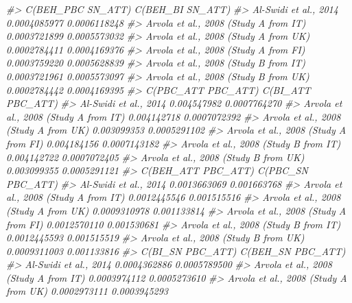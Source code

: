 \documentclass[
]{book}
\newenvironment{Shaded}{\begin{snugshade}}{\end{snugshade}}
\newcommand{\CommentTok}[1]{\textcolor[rgb]{0.56,0.35,0.01}{\textit{#1}}}
\begin{document}
\begin{Shaded}
\begin{Highlighting}[]
\CommentTok{\#\textgreater{}                                       C(BEH\_PBC SN\_ATT) C(BEH\_BI SN\_ATT)}
\CommentTok{\#\textgreater{} Al{-}Swidi et al., 2014                      0.0004085977     0.0006118248}
\CommentTok{\#\textgreater{} Arvola et al., 2008 (Study A from IT)      0.0003721899     0.0005573032}
\CommentTok{\#\textgreater{} Arvola et al., 2008 (Study A from UK)      0.0002784411     0.0004169376}
\CommentTok{\#\textgreater{} Arvola et al., 2008 (Study A from FI)      0.0003759220     0.0005628839}
\CommentTok{\#\textgreater{} Arvola et al., 2008 (Study B from IT)      0.0003721961     0.0005573097}
\CommentTok{\#\textgreater{} Arvola et al., 2008 (Study B from UK)      0.0002784442     0.0004169395}
\CommentTok{\#\textgreater{}                                       C(PBC\_ATT PBC\_ATT) C(BI\_ATT PBC\_ATT)}
\CommentTok{\#\textgreater{} Al{-}Swidi et al., 2014                        0.004547982      0.0007764270}
\CommentTok{\#\textgreater{} Arvola et al., 2008 (Study A from IT)        0.004142718      0.0007072392}
\CommentTok{\#\textgreater{} Arvola et al., 2008 (Study A from UK)        0.003099353      0.0005291102}
\CommentTok{\#\textgreater{} Arvola et al., 2008 (Study A from FI)        0.004184156      0.0007143182}
\CommentTok{\#\textgreater{} Arvola et al., 2008 (Study B from IT)        0.004142722      0.0007072405}
\CommentTok{\#\textgreater{} Arvola et al., 2008 (Study B from UK)        0.003099355      0.0005291121}
\CommentTok{\#\textgreater{}                                       C(BEH\_ATT PBC\_ATT) C(PBC\_SN PBC\_ATT)}
\CommentTok{\#\textgreater{} Al{-}Swidi et al., 2014                       0.0013663069       0.001663768}
\CommentTok{\#\textgreater{} Arvola et al., 2008 (Study A from IT)       0.0012445546       0.001515516}
\CommentTok{\#\textgreater{} Arvola et al., 2008 (Study A from UK)       0.0009310978       0.001133814}
\CommentTok{\#\textgreater{} Arvola et al., 2008 (Study A from FI)       0.0012570110       0.001530681}
\CommentTok{\#\textgreater{} Arvola et al., 2008 (Study B from IT)       0.0012445593       0.001515519}
\CommentTok{\#\textgreater{} Arvola et al., 2008 (Study B from UK)       0.0009311003       0.001133816}
\CommentTok{\#\textgreater{}                                       C(BI\_SN PBC\_ATT) C(BEH\_SN PBC\_ATT)}
\CommentTok{\#\textgreater{} Al{-}Swidi et al., 2014                     0.0004362886      0.0005789500}
\CommentTok{\#\textgreater{} Arvola et al., 2008 (Study A from IT)     0.0003974112      0.0005273610}
\CommentTok{\#\textgreater{} Arvola et al., 2008 (Study A from UK)     0.0002973111      0.0003945293}

\end{Highlighting}
\end{Shaded}
\end{document}
